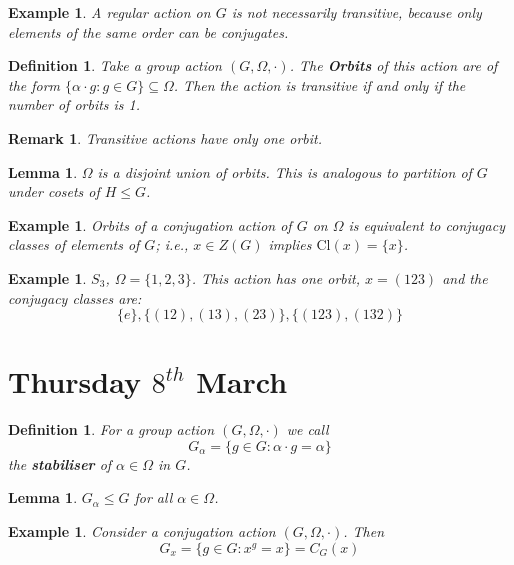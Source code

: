 \documentclass[a4paper,10pt]{article}
\newtheorem{Def}[thm]{Definition}
\newtheorem{eg}[thm]{Example}
\newtheorem{Lem}[thm]{Lemma}
\newtheorem{rem}[thm]{Remark}
\begin{document}
\begin{eg}
A regular action on $G$ is not necessarily transitive, because only elements of the same order can be conjugates.
\end{eg}

\begin{Def}
Take a group action $(G, \Omega, \cdot)$. The \textbf{Orbits} of this action are of the form $ \{ \alpha \cdot g : g \in G \} \subseteq \Omega$.
Then the action is transitive if and only if the number of orbits is 1.
\end{Def}

\begin{rem}
Transitive actions have only one orbit.
\end{rem}


\begin{Lem}
$\Omega$ is a disjoint union of orbits. This is analogous to partition of $G$ under cosets of $H \leq G$.
\end{Lem}

\begin{eg}
Orbits of a conjugation action of $G$ on $\Omega$ is equivalent to conjugacy classes of elements of $G$; i.e., $x \in Z(G)$ implies  $\text{Cl}(x) = \{x\}$.
\end{eg}

\begin{eg}
$S_3$, $\Omega = \{1,2,3\}$. This action has one orbit, $x = (123)$ and the conjugacy classes are:
\[ \{ e\}, \{ (12),(13),(23) \}, \{ (123),(132) \} \]
\end{eg}

\newpage
\section{Thursday $8^{th}$ March}


\begin{Def}
For a group action $(G , \Omega, \cdot)$ we call
\[ G_\alpha = \{ g \in G : \alpha \cdot g = \alpha \} \]
the \textbf{stabiliser} of $\alpha \in \Omega$ in $G$. 
\end{Def}

\begin{Lem}
$G_\alpha \leq G$ for all $\alpha \in \Omega$. 
\end{Lem}

\begin{eg}
Consider a conjugation action $(G, \Omega, \cdot)$. Then 
\[ G_x = \{ g \in G : x^g = x \} = C_G(x) \]
\end{eg}
\end{document}
